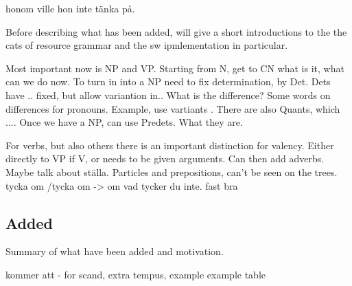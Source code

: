 \documentclass{report}
\begin{document}
honom ville hon inte tänka på.

Before describing what has been added, will give a short introductions to the
the cats of resource grammar and the sw ipmlementation in particular.

Most important now is NP and VP.
Starting from N, get to CN what is it, what can we do now.
To turn in into a NP need to fix determination, by Det. Dets have .. fixed,
but allow variantion in.. 
What is the difference? Some words on differences for pronouns.
Example, use vartiants {}.
There are also Quants, which .... 
Once we have a NP, can use Predets. What they are.

For verbs, but also others there is an important distinction for valency.
Either directly to VP if V, or needs to be given arguments. Can then add adverbs.
Maybe talk about ställa.
Particles and prepositions, can't be seen on the trees.
tycka om /tycka om -> om vad tycker du inte. fast bra



\subsection{Added}
Summary of what have been added and motivation.

kommer att - for scand, extra tempus, example
example table
\end{document}
